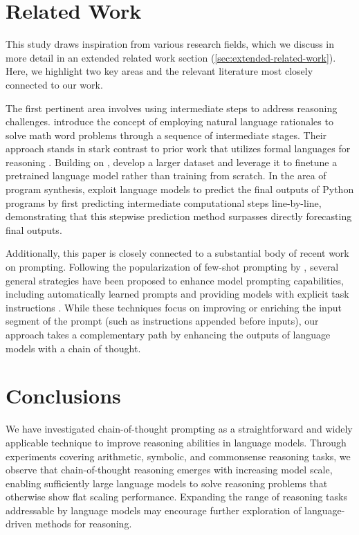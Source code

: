 \section{Related Work} This study draws inspiration from various research fields, which we discuss in more detail in an extended related work section (\cref{sec:extended-related-work}). Here, we highlight two key areas and the relevant literature most closely connected to our work.

The first pertinent area involves using intermediate steps to address reasoning challenges. \cite{ling-etal-2017-program} introduce the concept of employing natural language rationales to solve math word problems through a sequence of intermediate stages. Their approach stands in stark contrast to prior work that utilizes formal languages for reasoning \citep{roy-2016-reasoning, chiang-chen-2019-semantically, amini-etal-2019-mathqa, chen2019neural}. Building on \citet{ling-etal-2017-program}, \citet{cobbe2021training} develop a larger dataset and leverage it to finetune a pretrained language model rather than training from scratch. In the area of program synthesis, \cite{nye2021show} exploit language models to predict the final outputs of Python programs by first predicting intermediate computational steps line-by-line, demonstrating that this stepwise prediction method surpasses directly forecasting final outputs.

Additionally, this paper is closely connected to a substantial body of recent work on prompting. Following the popularization of few-shot prompting by \citet{brown2020language}, several general strategies have been proposed to enhance model prompting capabilities, including automatically learned prompts \citep{lester-etal-2021-power} and providing models with explicit task instructions \citep{wei2021finetuned,sanh2021multitask,ouyang2022training}. While these techniques focus on improving or enriching the input segment of the prompt (such as instructions appended before inputs), our approach takes a complementary path by enhancing the outputs of language models with a chain of thought.

\section{Conclusions}
We have investigated chain-of-thought prompting as a straightforward and widely applicable technique to improve reasoning abilities in language models. Through experiments covering arithmetic, symbolic, and commonsense reasoning tasks, we observe that chain-of-thought reasoning emerges with increasing model scale, enabling sufficiently large language models to solve reasoning problems that otherwise show flat scaling performance. Expanding the range of reasoning tasks addressable by language models may encourage further exploration of language-driven methods for reasoning.

